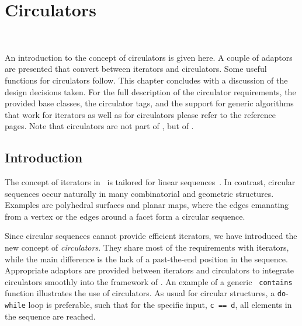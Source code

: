 
\gdef\lciIfHtmlClassLinks{\lcFalse}
\gdef\lciIfHtmlRefLinks{\lcFalse}
\gdef\lciIfHtmlLinks{\lcFalse}

\chapter{Circulators}
\label{chapterCirculators}

\\

An introduction to the concept of circulators is given here. A couple
of adaptors are presented that convert between iterators and
circulators. Some useful functions for circulators follow. This
chapter concludes with a discussion of the design decisions taken. For
the full description of the circulator requirements, the provided base
classes, the circulator tags, and the support for generic algorithms
that work for iterators as well as for circulators please refer to the
reference pages. Note that circulators are not part of \stl, but of \cgal.

\section{Introduction}
\label{sectionIntroduction}
\label{sectionCirculatorWarning}

The concept of iterators in \stl\ is tailored for linear
sequences~\cite{c-isplc-98,ms-strg-96}.  In contrast, circular
sequences occur naturally in many combinatorial and geometric
structures. Examples are polyhedral surfaces and planar maps, where
the edges emanating from a vertex or the edges around a facet form a
circular sequence.

Since circular sequences cannot provide efficient iterators, we have
introduced the new concept of {\em circulators}. They share most of
the requirements with iterators, while the main difference is the lack
of a past-the-end position in the sequence. Appropriate adaptors are
provided between iterators and circulators to integrate circulators
smoothly into the framework of \stl. An example of a generic {\tt
  contains} function illustrates the use of circulators.  As usual for
circular structures, a {\tt do}-{\tt while} loop is preferable, such
that for the specific input, {\tt c == d}, all elements in the
sequence are reached.

